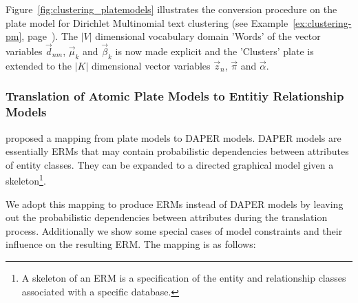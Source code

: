 Figure~\ref{fig:clustering_platemodels} illustrates the conversion procedure on the plate model for Dirichlet Multinomial text clustering (see Example~\ref{ex:clustering-pm}, page~\pageref{ex:clustering-pm}). The $|V|$ dimensional vocabulary domain 'Words' of the vector variables $\vec d_{nm}$, $\vec \mu_k$ and $\vec \beta_k$ is now made explicit and the 'Clusters' plate is extended to the $|K|$ dimensional vector variables $\vec z_n$, $\vec \pi$ and $\vec \alpha$.

\subsubsection{Translation of Atomic Plate Models to Entitiy Relationship Models}

\textcite{heckerman2007probabilistic} proposed a mapping from plate models to DAPER models. DAPER models are essentially ERMs that may contain probabilistic dependencies between attributes of entity classes. They can be expanded to a directed graphical model given a skeleton\footnote{A skeleton of an ERM is a specification of the entity and relationship classes associated with a specific database.}.

We adopt this mapping to produce ERMs instead of DAPER models by leaving out the probabilistic dependencies between attributes during the translation process. Additionally we show some special cases of model constraints and their influence on the resulting ERM. The mapping is as follows:


